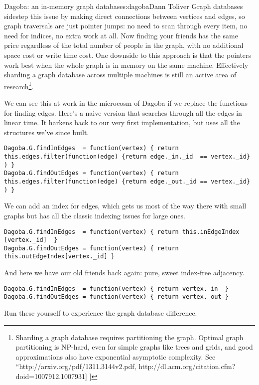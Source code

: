 \begin{aosachapter}{Dagoba: an in-memory graph database}{s:dagoba}{Dann Toliver}
Graph databases sidestep this issue by making direct connections between
vertices and edges, so graph traversals are just pointer jumps: no need
to scan through every item, no need for indices, no extra work at all.
Now finding your friends has the same price regardless of the total
number of people in the graph, with no additional space cost or write
time cost. One downside to this approach is that the pointers work best
when the whole graph is in memory on the same machine. Effectively
sharding a graph database across multiple machines is still an active
area of research\footnote{Sharding a graph database requires
  partitioning the graph. Optimal graph partitioning is NP-hard, even
  for simple graphs like trees and grids, and good approximations also
  have exponential asymptotic complexity. See
  ``http://arxiv.org/pdf/1311.3144v2.pdf,
  http://dl.acm.org/citation.cfm?doid=1007912.1007931{]} {]}}.

We can see this at work in the microcosm of Dagoba if we replace the
functions for finding edges. Here's a naive version that searches
through all the edges in linear time. It harkens back to our very first
implementation, but uses all the structures we've since built.

\begin{verbatim}
Dagoba.G.findInEdges  = function(vertex) { return this.edges.filter(function(edge) {return edge._in._id  == vertex._id} ) }
Dagoba.G.findOutEdges = function(vertex) { return this.edges.filter(function(edge) {return edge._out._id == vertex._id} ) }
\end{verbatim}

We can add an index for edges, which gets us most of the way there with
small graphs but has all the classic indexing issues for large ones.

\begin{verbatim}
Dagoba.G.findInEdges  = function(vertex) { return this.inEdgeIndex [vertex._id]  }
Dagoba.G.findOutEdges = function(vertex) { return this.outEdgeIndex[vertex._id] }
\end{verbatim}

And here we have our old friends back again: pure, sweet index-free
adjacency.

\begin{verbatim}
Dagoba.G.findInEdges  = function(vertex) { return vertex._in  }
Dagoba.G.findOutEdges = function(vertex) { return vertex._out }
\end{verbatim}

Run these yourself to experience the graph database difference.


\end{aosachapter}
